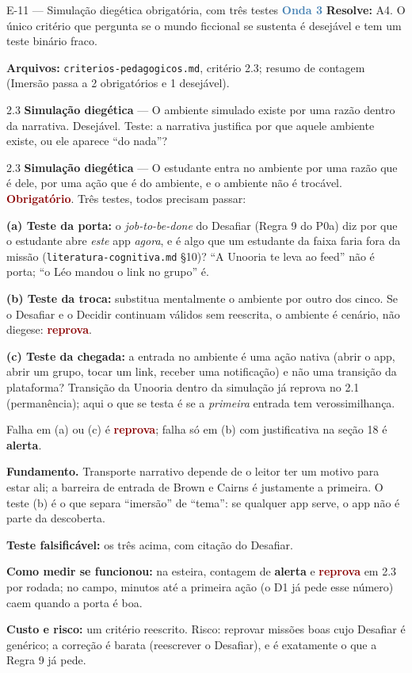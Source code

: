 \documentclass[11pt,a4paper]{article}
\newcommand{\obrig}{\textcolor{DarkRed}{\textbf{Obrigatório}}}
\newcommand{\rep}{\textcolor{DarkRed}{\textbf{reprova}}}
\newcommand{\alerta}{\textcolor{DarkYellow}{\textbf{alerta}}}
\newcommand{\onda}[1]{\textcolor{SteelBlue}{\textbf{Onda #1}}}
\begin{document}
\begin{emendabox}{E-11 --- Simulação diegética obrigatória, com três testes \hfill \onda{3}}
\textbf{Resolve:} A4. O único critério que pergunta se o mundo ficcional se sustenta é desejável e
tem um teste binário fraco.

\textbf{Arquivos:} \texttt{criterios-pedagogicos.md}, critério 2.3; resumo de contagem (Imersão
passa a 2 obrigatórios e 1 desejável).

\begin{antesbox}\small
2.3 \textbf{Simulação diegética} --- O ambiente simulado existe por uma razão dentro da narrativa.
Desejável. Teste: a narrativa justifica por que aquele ambiente existe, ou ele aparece ``do
nada''?
\end{antesbox}

\begin{depoisbox}\small
2.3 \textbf{Simulação diegética} --- O estudante entra no ambiente por uma razão que é dele, por
uma ação que é do ambiente, e o ambiente não é trocável. \obrig{}. Três testes, todos precisam
passar:

\textbf{(a) Teste da porta:} o \emph{job-to-be-done} do Desafiar (Regra 9 do P0a) diz por que o
estudante abre \emph{este} app \emph{agora}, e é algo que um estudante da faixa faria fora da
missão (\texttt{literatura-cognitiva.md} \S10)? ``A Unooria te leva ao feed'' não é porta; ``o
Léo mandou o link no grupo'' é.

\textbf{(b) Teste da troca:} substitua mentalmente o ambiente por outro dos cinco. Se o Desafiar
e o Decidir continuam válidos sem reescrita, o ambiente é cenário, não diegese: \rep.

\textbf{(c) Teste da chegada:} a entrada no ambiente é uma ação nativa (abrir o app, abrir um
grupo, tocar um link, receber uma notificação) e não uma transição da plataforma? Transição da
Unooria dentro da simulação já reprova no 2.1 (permanência); aqui o que se testa é se a
\emph{primeira} entrada tem verossimilhança.

Falha em (a) ou (c) é \rep{}; falha só em (b) com justificativa na seção 18 é \alerta.
\end{depoisbox}

\textbf{Fundamento.} Transporte narrativo \cite{green2000, vanlaer2014} depende de o leitor ter um
motivo para estar ali; a barreira de entrada de Brown e Cairns \cite{brown2004} é justamente a
primeira. O teste (b) é o que separa ``imersão'' de ``tema'': se qualquer app serve, o app não é
parte da descoberta.

\textbf{Teste falsificável:} os três acima, com citação do Desafiar.

\textbf{Como medir se funcionou:} na esteira, contagem de \alerta{} e \rep{} em 2.3 por rodada;
no campo, minutos até a primeira ação (o D1 já pede esse número) caem quando a porta é boa.

\textbf{Custo e risco:} um critério reescrito. Risco: reprovar missões boas cujo Desafiar é
genérico; a correção é barata (reescrever o Desafiar), e é exatamente o que a Regra 9 já pede.
\end{emendabox}
\end{document}
